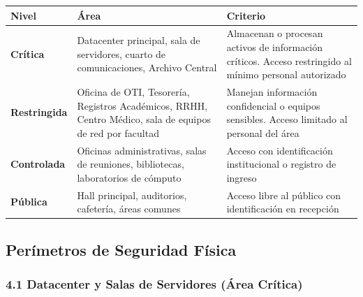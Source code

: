 \documentclass[10pt,letterpaper]{article}
\begin{document}
{\setlength{\RaggedRightRightskip}{0pt plus 5em}\small\sloppy \begin{longtable}[]{@{}
  >{\hspace{0pt}\RaggedRight\arraybackslash}p{}
  >{\hspace{0pt}\RaggedRight\arraybackslash}p{}
  >{\hspace{0pt}\RaggedRight\arraybackslash}p{}@{}}
\toprule\noalign{}
\begin{minipage}[b]{\linewidth}\raggedright
Nivel
\end{minipage} & \begin{minipage}[b]{\linewidth}\raggedright
Área
\end{minipage} & \begin{minipage}[b]{\linewidth}\raggedright
Criterio
\end{minipage} \\
\midrule\noalign{}
\endhead
\bottomrule\noalign{}
\endlastfoot
\textbf{Crítica} & Datacenter principal, sala de servidores, cuarto de
comunicaciones, Archivo Central & Almacenan o procesan activos de
información críticos. Acceso restringido al mínimo personal
autorizado \\
\textbf{Restringida} & Oficina de OTI, Tesorería, Registros Académicos,
RRHH, Centro Médico, sala de equipos de red por facultad & Manejan
información confidencial o equipos sensibles. Acceso limitado al
personal del área \\
\textbf{Controlada} & Oficinas administrativas, salas de reuniones,
bibliotecas, laboratorios de cómputo & Acceso con identificación
institucional o registro de ingreso \\
\textbf{Pública} & Hall principal, auditorios, cafetería, áreas comunes
& Acceso libre al público con identificación en recepción \\
\end{longtable}\normalsize}

\subsection{Perímetros de Seguridad
Física}\label{peruxedmetros-de-seguridad-fuxedsica}

\subsubsection{4.1 Datacenter y Salas de Servidores (Área
Crítica)}\label{datacenter-y-salas-de-servidores-uxe1rea-cruxedtica}
\end{document}
